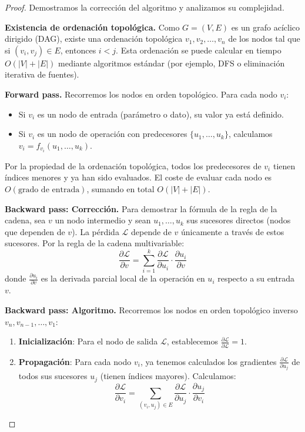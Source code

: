 \begin{proof}
	Demostramos la corrección del algoritmo y analizamos su complejidad.

	\textbf{Existencia de ordenación topológica.}
	Como \(G = (V, E)\) es un grafo acíclico dirigido (DAG), existe una ordenación topológica \(v_1, v_2, \ldots, v_n\) de los nodos tal que si \((v_i, v_j) \in E\), entonces \(i < j\). Esta ordenación se puede calcular en tiempo \(O(|V| + |E|)\) mediante algoritmos estándar (por ejemplo, DFS o eliminación iterativa de fuentes).

	\textbf{Forward pass.}
	Recorremos los nodos en orden topológico. Para cada nodo \(v_i\):
	\begin{itemize}
		\item Si \(v_i\) es un nodo de entrada (parámetro o dato), su valor ya está definido.
		\item Si \(v_i\) es un nodo de operación con predecesores \(\{u_1, \ldots, u_k\}\), calculamos \(v_i = f_{v_i}(u_1, \ldots, u_k)\).
	\end{itemize}
	Por la propiedad de la ordenación topológica, todos los predecesores de \(v_i\) tienen índices menores y ya han sido evaluados. El coste de evaluar cada nodo es \(O(\text{grado de entrada})\), sumando en total \(O(|V| + |E|)\).

	\textbf{Backward pass: Corrección.}
	Para demostrar la fórmula de la regla de la cadena, sea \(v\) un nodo intermedio y sean \(u_1, \ldots, u_k\) sus sucesores directos (nodos que dependen de \(v\)). La pérdida \(\mathcal{L}\) depende de \(v\) únicamente a través de estos sucesores. Por la regla de la cadena multivariable:
	\[
		\frac{\partial \mathcal{L}}{\partial v} = \sum_{i=1}^{k} \frac{\partial \mathcal{L}}{\partial u_i} \cdot \frac{\partial u_i}{\partial v}
	\]
	donde \(\frac{\partial u_i}{\partial v}\) es la derivada parcial local de la operación en \(u_i\) respecto a su entrada \(v\).

	\textbf{Backward pass: Algoritmo.}
	Recorremos los nodos en orden topológico inverso \(v_n, v_{n-1}, \ldots, v_1\):
	\begin{enumerate}
		\item \textbf{Inicialización}: Para el nodo de salida \(\mathcal{L}\), establecemos \(\frac{\partial \mathcal{L}}{\partial \mathcal{L}} = 1\).
		\item \textbf{Propagación}: Para cada nodo \(v_i\), ya tenemos calculados los gradientes \(\frac{\partial \mathcal{L}}{\partial u_j}\) de todos sus sucesores \(u_j\) (tienen índices mayores). Calculamos:
		\[
			\frac{\partial \mathcal{L}}{\partial v_i} = \sum_{(v_i, u_j) \in E} \frac{\partial \mathcal{L}}{\partial u_j} \cdot \frac{\partial u_j}{\partial v_i}
		\]
	\end{enumerate}


\end{proof}
